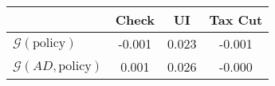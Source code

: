 \begin{tabular}{@{}lccc@{}} 
\toprule 
                          & Check      & UI    & Tax Cut    \\  \midrule 
$\mathcal{G}(\text{policy})$ & -0.001  & 0.023  & -0.001     \\ 
$\mathcal{G}(AD,\text{policy})$ & 0.001  & 0.026  & -0.000     \\ 
\end{tabular}  
